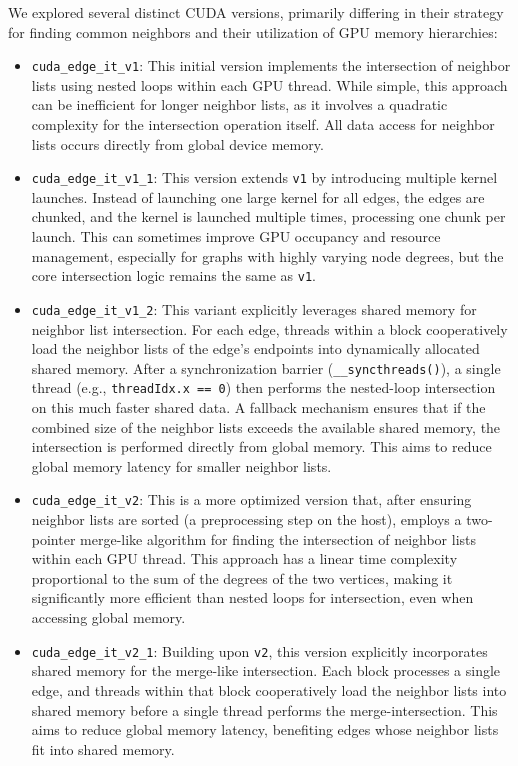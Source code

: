 \documentclass{aes2e}
\begin{document}
We explored several distinct CUDA versions, primarily differing in their strategy for finding common neighbors and their utilization of GPU memory hierarchies:

\begin{itemize}
    \item \texttt{cuda\_edge\_it\_v1}: This initial version implements the intersection of neighbor lists using nested loops within each GPU thread. While simple, this approach can be inefficient for longer neighbor lists, as it involves a quadratic complexity for the intersection operation itself. All data access for neighbor lists occurs directly from global device memory.
    \item \texttt{cuda\_edge\_it\_v1\_1}: This version extends \texttt{v1} by introducing multiple kernel launches. Instead of launching one large kernel for all edges, the edges are chunked, and the kernel is launched multiple times, processing one chunk per launch. This can sometimes improve GPU occupancy and resource management, especially for graphs with highly varying node degrees, but the core intersection logic remains the same as \texttt{v1}.
    \item \texttt{cuda\_edge\_it\_v1\_2}: This variant explicitly leverages shared memory for neighbor list intersection. For each edge, threads within a block cooperatively load the neighbor lists of the edge's endpoints into dynamically allocated shared memory. After a synchronization barrier (\texttt{\_\_syncthreads()}), a single thread (e.g., \texttt{threadIdx.x == 0}) then performs the nested-loop intersection on this much faster shared data. A fallback mechanism ensures that if the combined size of the neighbor lists exceeds the available shared memory, the intersection is performed directly from global memory. This aims to reduce global memory latency for smaller neighbor lists.
    \item \texttt{cuda\_edge\_it\_v2}: This is a more optimized version that, after ensuring neighbor lists are sorted (a preprocessing step on the host), employs a two-pointer merge-like algorithm for finding the intersection of neighbor lists within each GPU thread. This approach has a linear time complexity proportional to the sum of the degrees of the two vertices, making it significantly more efficient than nested loops for intersection, even when accessing global memory.
    \item \texttt{cuda\_edge\_it\_v2\_1}: Building upon \texttt{v2}, this version explicitly incorporates shared memory for the merge-like intersection. Each block processes a single edge, and threads within that block cooperatively load the neighbor lists into shared memory before a single thread performs the merge-intersection. This aims to reduce global memory latency, benefiting edges whose neighbor lists fit into shared memory.

\end{itemize}
\end{document}

